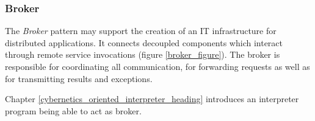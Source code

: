 %
%
%
%
%
%
%

\subsubsection{Broker}
\label{broker_heading}

The \emph{Broker} pattern \cite{buschmann} may support the creation of an IT
infrastructure for distributed applications. It connects decoupled components
which interact through remote service invocations (figure \ref{broker_figure}).
The broker is responsible for coordinating all communication, for forwarding
requests as well as for transmitting results and exceptions.

%
%

Chapter \ref{cybernetics_oriented_interpreter_heading} introduces an
interpreter program being able to act as broker.
